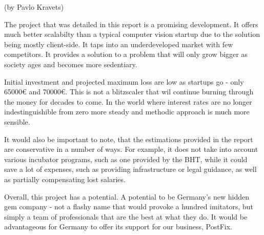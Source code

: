 (by Pavlo Kravets)

\p
The project that was detailed in this report is a promising development. It offers much better scalabilty than a typical computer vision startup due to the solution being mostly client-side. It taps into an underdeveloped market with few competitors. It provides a solution to a problem that will only grow bigger as society ages and becomes more sedentiary.

\p
Initial investment and projected maximum loss are low as startups go - only 65000€ and 70000€. This is not a blitzscaler that wil continue burning through the money for decades to come. In the world where interest rates are no longer indestinguishible from zero more steady and methodic approach is much more sensible.

\p
It would also be important to note, that the estimations provided in the report are conservative in a number of ways. For example, it does not take into account various incubator programs, such as one provided by the BHT, while it could save a lot of expenses, such as providing infrastructure or legal guidance, as well as partially compensating lost salaries. 

\p
Overall, this project has a potential. A potential to be Germany's new hidden gem company - not a flashy name that would provoke a hundred imitators, but simply a team of professionals that are the best at what they do. It would be advantageous for Germany to offer its support for our business, PostFix.